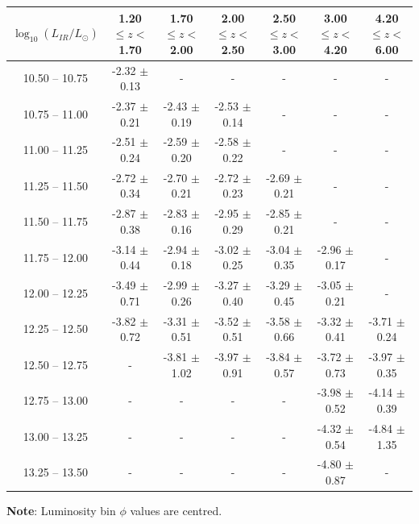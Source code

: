 \begin{landscape}
\begin{table}
\begin{center}
\begin{tabular}{@{}ccccccc@{}}
        \hline
        $\log_{10}(L_{IR}/L_{\odot})$ & 1.20 $\leq z <$ 1.70 & 1.70 $\leq z <$ 2.00 & 2.00 $\leq z <$ 2.50 & 2.50 $\leq z <$ 3.00 & 3.00 $\leq z <$ 4.20 & 4.20 $\leq z <$ 6.00  \\
        \hline
        10.50 -- 10.75 & -2.32 $\pm$ 0.13 & - & - & - & - & - \\
        10.75 -- 11.00 & -2.37 $\pm$ 0.21 & -2.43 $\pm$ 0.19 & -2.53 $\pm$ 0.14 & - & - & - \\
        11.00 -- 11.25 & -2.51 $\pm$ 0.24 & -2.59 $\pm$ 0.20 & -2.58 $\pm$ 0.22 & - & - & - \\
        11.25 -- 11.50 & -2.72 $\pm$ 0.34 & -2.70 $\pm$ 0.21 & -2.72 $\pm$ 0.23 & -2.69 $\pm$ 0.21 & - & - \\
        11.50 -- 11.75 & -2.87 $\pm$ 0.38 & -2.83 $\pm$ 0.16 & -2.95 $\pm$ 0.29 & -2.85 $\pm$ 0.21 & - & - \\
        11.75 -- 12.00 & -3.14 $\pm$ 0.44 & -2.94 $\pm$ 0.18 & -3.02 $\pm$ 0.25 & -3.04 $\pm$ 0.35 & -2.96 $\pm$ 0.17 & - \\
        12.00 -- 12.25 & -3.49 $\pm$ 0.71 & -2.99 $\pm$ 0.26 & -3.27 $\pm$ 0.40 & -3.29 $\pm$ 0.45 & -3.05 $\pm$ 0.21 & - \\
        12.25 -- 12.50 & -3.82 $\pm$ 0.72 & -3.31 $\pm$ 0.51 & -3.52 $\pm$ 0.51 & -3.58 $\pm$ 0.66 & -3.32 $\pm$ 0.41 & -3.71 $\pm$ 0.24 \\
        12.50 -- 12.75 & -                & -3.81 $\pm$ 1.02 & -3.97 $\pm$ 0.91 & -3.84 $\pm$ 0.57 & -3.72 $\pm$ 0.73 & -3.97 $\pm$ 0.35 \\
        12.75 -- 13.00 & -                & -                & -                & -                & -3.98 $\pm$ 0.52 & -4.14 $\pm$ 0.39 \\
        13.00 -- 13.25 & -                & -                & -                & -                & -4.32 $\pm$ 0.54 & -4.84 $\pm$ 1.35 \\
        13.25 -- 13.50 & -                & -                & -                & -                & -4.80 $\pm$ 0.87 & - \\
        \bottomrule
    \end{tabular}
    \end{center}
    \textbf{Note}: Luminosity bin $\phi$ values are centred.
    \end{table}
\end{landscape}

